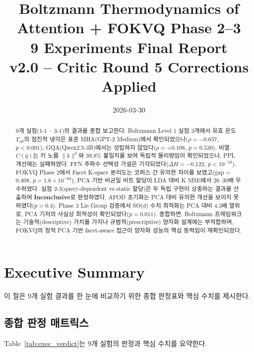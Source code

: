 \documentclass[11pt,a4paper]{article}
\title{Boltzmann Thermodynamics of Attention + FOKVQ Phase 2--3\\[0.3em]\large{9 Experiments Final Report}\\[0.3em]\small{v2.0 -- Critic Round 5 Corrections Applied}}
\author{2026-03-30}
\date{}
\begin{document}
\maketitle

\begin{abstract}
9개 실험(1-1 -- 3-1)의 결과를 종합 보고한다.
Boltzmann Level 1 실험 3개에서 유효 온도 $T_\mathrm{eff}$의 점진적 냉각은 표준 MHA(GPT-2 Medium)에서 확인되었으나($\rho = -0.657$, $p < 0.001$), GQA(Qwen2.5-3B)에서는 성립하지 않았다($\rho = +0.108$, $p = 0.530$).
비열 $C(q)$는 키 노름 $\|k\|^2$와 39.8\% 불일치를 보여 독립적 물리량임이 확인되었으나, PPL 개선에는 실패하였다.
FFN 주파수 선택성 가설은 기각되었다($\Delta H = -0.122$, $p < 10^{-10}$).
FOKVQ Phase 2에서 Facet K-space 분리도는 코퍼스 간 유의한 차이를 보였고(gap = 0.408, $p = 1.6 \times 10^{-64}$), PCA 기반 비균일 비트 할당이 LDA 대비 K MSE에서 26--30배 우수하였다.
실험 2-3(query-dependent vs static 할당)은 두 독립 구현이 상충하는 결과를 산출하여 \textbf{Inconclusive}로 판정하였다.
AFOD 초기화는 PCA 대비 유의한 개선을 보이지 못하였다($p > 0.4$).
Phase 3 Lie Group 검증에서 SO($d$) 수치 최적화는 PCA 대비 4.3배 열위로, PCA 기저의 사실상 최적성이 확인되었다($p = 0.011$).
종합하면, Boltzmann 프레임워크는 기술적(descriptive) 가치를 가지나 규범적(prescriptive) 양자화 설계에는 부적합하며, FOKVQ의 정적 PCA 기반 facet-aware 접근이 양자화 성능의 핵심 동력임이 재확인되었다.
\end{abstract}

\tableofcontents
\newpage

\section{Executive Summary}

이 절은 9개 실험 결과를 한 눈에 비교하기 위한 종합 판정표와 핵심 수치를 제시한다.

\subsection{종합 판정 매트릭스}

Table~\ref{tab:exec_verdict}는 9개 실험의 판정과 핵심 수치를 요약한다.
\end{document}
